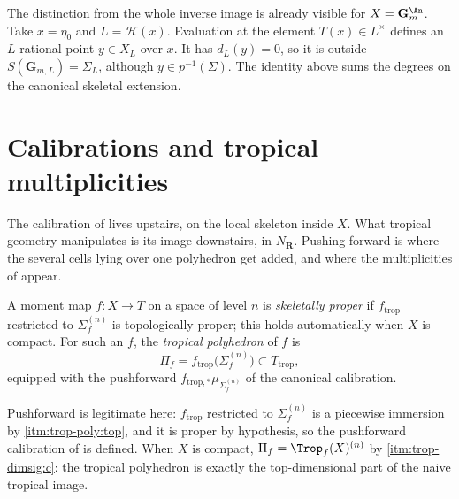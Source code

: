 The distinction from the whole inverse image is already visible for
$X=\mathbf G_m^{\An}$. Take $x=\eta_0$ and $L=\mathcal H(x)$.
Evaluation at the element $T(x)\in L^\times$ defines an $L$-rational point
$y\in X_L$ over $x$. It has $d_L(y)=0$, so it is outside
$S(\mathbf G_{m,L})=\Sigma_L$, although $y\in p^{-1}(\Sigma)$.
The identity above sums the degrees on the canonical skeletal extension.

\section{Calibrations and tropical multiplicities}
\label{sec:trop-multiplicities}

The calibration of  lives upstairs, on the local
skeleton inside $X$. What tropical geometry manipulates is its image
downstairs, in $N_{\mathbf R}$. Pushing forward is where the several cells
lying over one polyhedron get added, and where the multiplicities of
 appear.

\begin{definition}
\label{def:trop-tropical-polyhedron}
A moment map $f:X\to T$ on a space of level $n$ is \emph{skeletally proper}
if $f_{\mathrm{trop}}$ restricted to $\Sigma_f^{(n)}$ is topologically
proper; this holds automatically when $X$ is compact. For such an $f$, the
\emph{tropical polyhedron} of $f$ is
\[
 \Pi_f=f_{\mathrm{trop}}\bigl(\Sigma_f^{(n)}\bigr)\subset T_{\mathrm{trop}},
\]
equipped with the pushforward $f_{\mathrm{trop},*}\mu_{\Sigma_f^{(n)}}$ of
the canonical calibration.
\end{definition}

Pushforward is legitimate here: $f_{\mathrm{trop}}$ restricted to
$\Sigma_f^{(n)}$ is a piecewise immersion by
 \cref{itm:trop-poly:top}, and it is proper
by hypothesis, so the pushforward calibration of
 is defined. When $X$ is compact,
$\Pi_f=\Trop_f(X)^{(n)}$ by 
\cref{itm:trop-dimsig:c}: the tropical polyhedron is exactly the
top-dimensional part of the naive tropical image.

